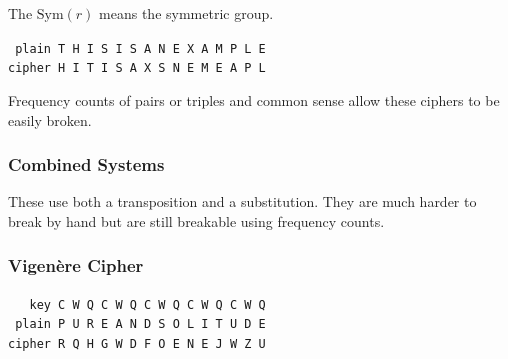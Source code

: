 \documentclass{article}
\begin{document}
The $\text{Sym}(r)$ means the symmetric group. \cite{wiki:sym}

\begin{center}
    \texttt{
         plain \quad T H I S I \; S A N E X \; A M P L E\\
        cipher \quad H I T I S \; A X S N E \;  M E A P L
    }
\end{center}

Frequency counts of pairs or triples and common sense allow these ciphers to be easily broken.

\subsubsection{Combined Systems}

These use both a transposition and a substitution. They are much harder to break by hand but are still breakable using frequency counts.

\subsubsection{Vigenère Cipher}

\begin{center}
    \texttt{
        \ \ key \quad C W Q C W Q C W Q C W Q C W Q\\
        \ plain \quad P U R E A N D S O L I T U D E\\
         cipher \quad R Q H G W D F O E N E J W Z U
    }
\end{center}

\newpage



\end{document}
